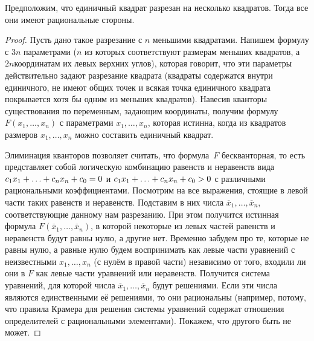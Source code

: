 \begin{theorem}
%
%
%
        \label{square-dissected}%
Предположим, что единичный квадрат разрезан на несколько квадратов.
Тогда все они имеют рациональные стороны.
\end{theorem}

\begin{proof}
Пусть дано такое разрезание с $n$ меньшими квадратами.
Напишем формулу с $3n$ параметрами ($n$ из которых соответствуют
размерам меньших квадратов, а~$2n$\т координатам их левых верхних
углов), которая говорит, что эти параметры действительно задают
разрезание квадрата (квадраты содержатся внутри единичного, не
имеют общих точек и всякая точка единичного квадрата покрывается
хотя бы одним из меньших квадратов). Навесив кванторы существования
по переменным, задающим координаты, получим формулу $F(x_1,\dots,x_n)$
с параметрами $x_1,\dots,x_n$,
которая истинна, когда из квадратов размеров $x_1,\dots,x_n$ можно
составить единичный квадрат.

Элиминация кванторов позволяет считать, что формула~$F$
бескванторная, то есть представляет собой логическую комбинацию
равенств и неравенств вида $c_1x_1\hm+\ldots\hm+c_nx_n\hm+c_0\hm=0$ и
$c_1x_1\hm+\ldots\hm+c_nx_n\hm+c_0\hm> 0$ с различными рациональными
коэффициентами. Посмотрим на все выражения, стоящие в левой
части таких равенств и неравенств. Подставим в них числа
$\overline{x}_1,\dots,\overline{x}_n$, соответствующие
данному нам разрезанию. При этом получится истинная формула
$F(\overline{x}_1,\dots,\overline{x}_n)$, в которой некоторые из левых
частей равенств и неравенств
будут
равны нулю, а другие нет. Временно забудем про те,
которые не равны нулю, а равные нулю будем воспринимать как левые части
уравнений с неизвестными $x_1,\dots,x_n$ (с
нулём в правой части) независимо от того, входили ли они в $F$ как
левые части уравнений или неравенств.
Получится система уравнений, для
которой числа $\overline{x}_1,\dots,\overline{x}_n$ будут
решениями. Если эти числа являются единственными её решениями,
то они рациональны (например, потому, что правила Крамера
для решения системы уравнений содержат отношения определителей с
рациональными элементами). Покажем, что другого быть не
может.


\end{proof}
